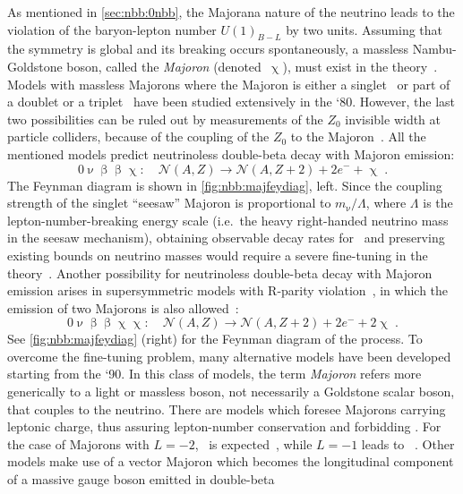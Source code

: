 As mentioned in \cref{sec:nbb:0nbb}, the Majorana nature of the neutrino leads to the
violation of the baryon-lepton number $U{(1)}_{B-L}$ by two units.  Assuming that the
symmetry is global and its breaking occurs spontaneously, a massless Nambu-Goldstone
boson, called the \emph{Majoron} (denoted~$\upchi$), must exist in the
theory~\cite{Chikashige1981, Schechter1982b, Gelmini1981, Georgi1981, Mohpatra2004}.
Models with massless Majorons where the Majoron is either a singlet~\cite{Chikashige1981}
or part of a doublet or a triplet~\cite{Gelmini1981, Georgi1981} have been studied
extensively in the `80. However, the last two possibilities can be ruled out by
measurements of the $Z_0$ invisible width at particle colliders, because of the coupling
of the $Z_0$ to the Majoron~\cite{Berezhiani1992}. All the mentioned models predict
neutrinoless double-beta decay with Majoron emission:
\[
  0\upnu\upbeta\upbeta\upchi:\quad
    \mathcal{N}(A,Z) \longrightarrow \mathcal{N}(A,Z+2) + 2e^- + \upchi \;.
\]
The Feynman diagram is shown in \cref{fig:nbb:majfeydiag}, left. Since the
coupling strength of the singlet ``seesaw'' Majoron is proportional to $m_{\upnu} /
\Lambda$, where $\Lambda$ is the lepton-number-breaking energy scale (i.e.~the
heavy right-handed neutrino mass in the seesaw mechanism), obtaining observable
decay rates for \onbbx\ and preserving existing bounds on neutrino masses would
require a severe fine-tuning in the theory~\cite{Burgess1993, Burgess1994}.
\newpar
Another possibility for neutrinoless double-beta decay with Majoron emission
arises in supersymmetric models with R-parity violation~\cite{Masiero1990,
Mohpatra2004}, in which the emission of two Majorons is also
allowed~\cite{Mohpatra1988}:
\[
  0\upnu\upbeta\upbeta\upchi\upchi:\quad
    \mathcal{N}(A,Z) \longrightarrow \mathcal{N}(A,Z+2) + 2e^- + 2\upchi \;.
\]
See \cref{fig:nbb:majfeydiag} (right) for the Feynman diagram of the process.
\newpar
To overcome the fine-tuning problem, many alternative models have been developed starting
from the `90. In this class of models, the term \emph{Majoron} refers more generically to
a light or massless boson, not necessarily a Goldstone scalar boson, that couples to the
neutrino. There are models which foresee Majorons carrying leptonic charge, thus assuring
lepton-number conservation and forbidding \onbb. For the case of Majorons with $L = −2$,
\onbbx\ is expected~\cite{Burgess1993}, while $L = −1$ leads to
\onbbxx~\cite{Burgess1994}. Other models make use of a vector Majoron which becomes the
longitudinal component of a massive gauge boson emitted in double-beta
